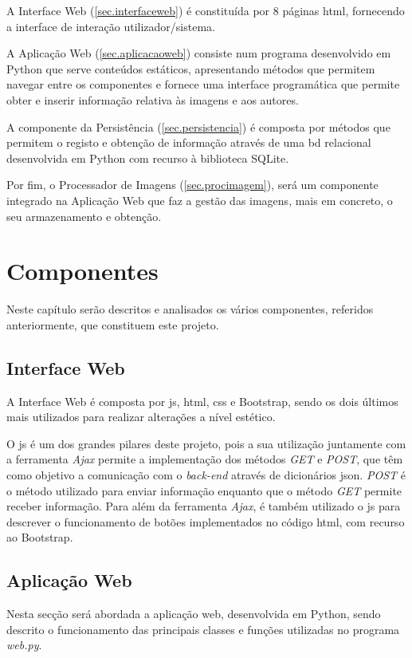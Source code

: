 \documentclass{report}
\begin{document}
A Interface Web (\autoref{sec.interfaceweb}) é constituída por 8 páginas \ac{html}, fornecendo a interface de interação utilizador/sistema.

A Aplicação Web (\autoref{sec.aplicacaoweb}) consiste num programa desenvolvido em Python que serve conteúdos estáticos, apresentando métodos que permitem navegar entre os componentes e fornece uma interface programática que permite obter e inserir informação relativa às imagens e aos autores.

A componente da Persistência (\autoref{sec.persistencia}) é composta por métodos que permitem o registo e obtenção de informação através de uma \ac{bd} relacional desenvolvida em Python com recurso à biblioteca SQLite.

Por fim, o Processador de Imagens (\autoref{sec.procimagem}), será um componente integrado na Aplicação Web que faz a gestão das imagens, mais em concreto, o seu armazenamento e obtenção.

\chapter{Componentes}
\label{chap.componentes}
Neste capítulo serão descritos e analisados os vários componentes, referidos anteriormente, que constituem este projeto.

\section{Interface Web}
\label{sec.interfaceweb}

A Interface Web é composta por \ac{js}, \ac{html}, \ac{css} e Bootstrap, sendo os dois últimos mais utilizados para realizar alterações a nível estético.

O \ac{js} é um dos grandes pilares deste projeto, pois a sua utilização juntamente com
a ferramenta \textit{Ajax} permite a implementação dos métodos \textit{GET} e \textit{POST}, que têm como objetivo a comunicação com o \textit{back-end} através de dicionários \ac{json}. \textit{POST} é o método utilizado para enviar informação enquanto que o método \textit{GET} permite receber informação. Para além da ferramenta \textit{Ajax}, é também utilizado o \ac{js} para descrever o funcionamento de botões implementados no código \ac{html}, com recurso ao Bootstrap.


\section{Aplicação Web}
\label{sec.aplicacaoweb}
Nesta secção será abordada a aplicação web, desenvolvida em Python, sendo descrito o funcionamento das principais classes e funções utilizadas no programa \textit{web.py}.
\end{document}
